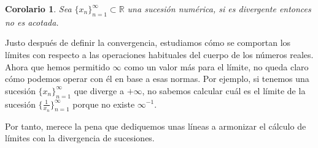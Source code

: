 \documentclass[10pt,a4paper,openright]{book}
\theoremstyle{break}
\newtheorem{coro}{Corolario}[theo]
\begin{document}
\begin{coro}
Sea $\{x_n\}_{n=1}^\infty\subset \mathbb R$ una sucesión numérica, si es divergente entonces no es acotada.
\end{coro}

Justo después de definir la convergencia, estudiamos cómo se comportan los límites con respecto a las operaciones habituales del cuerpo de los números reales. Ahora que hemos permitido $\infty$ como un valor más para el límite, no queda claro cómo podemos operar con él en base a esas normas. Por ejemplo, si tenemos una sucesión $\{x_n\}_{n=1}^\infty$ que diverge a $+\infty$, no sabemos calcular cuál es el límite de la sucesión $\{\frac{1}{x_n}\}_{n=1}^\infty$ porque no existe $\infty^{-1}$.

Por tanto, merece la pena que dediquemos unas líneas a armonizar el cálculo de límites con la divergencia de sucesiones.
\end{document}
